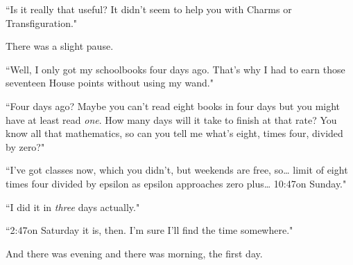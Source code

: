``Is it really that useful? It didn't seem to help you with Charms or Transfiguration."

There was a slight pause.

``Well, I only got my schoolbooks four days ago. That's why I had to earn those seventeen House points without using my wand."

``Four days ago? Maybe you can't read eight books in four days but you might have at least read \emph{one}. How many days will it take to finish at that rate? You know all that mathematics, so can you tell me what's eight, times four, divided by zero?"

``I've got classes now, which you didn't, but weekends are free, so{\ldots} limit of eight times four divided by epsilon as epsilon approaches zero plus{\ldots} 10:47\am on Sunday."

``I did it in \emph{three} days actually."

``2:47\pm on Saturday it is, then. I'm sure I'll find the time somewhere."

And there was evening and there was morning, the first day.

